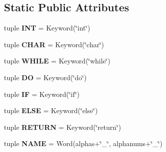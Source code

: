 \subsection*{Static Public Attributes}
\begin{DoxyCompactItemize}
\item 
\hypertarget{classxutools_1_1parsers_1_1_subset_c_parser_ab004e56225deb82d0e89f5968cf162ac}{tuple {\bfseries I\-N\-T} = Keyword(\char`\"{}int\char`\"{})}\label{classxutools_1_1parsers_1_1_subset_c_parser_ab004e56225deb82d0e89f5968cf162ac}

\item 
\hypertarget{classxutools_1_1parsers_1_1_subset_c_parser_a0655ec243d8c8fbed09faadf87ac3e81}{tuple {\bfseries C\-H\-A\-R} = Keyword(\char`\"{}char\char`\"{})}\label{classxutools_1_1parsers_1_1_subset_c_parser_a0655ec243d8c8fbed09faadf87ac3e81}

\item 
\hypertarget{classxutools_1_1parsers_1_1_subset_c_parser_a2b2f67890f89d4f05b394e1e363e0a23}{tuple {\bfseries W\-H\-I\-L\-E} = Keyword(\char`\"{}while\char`\"{})}\label{classxutools_1_1parsers_1_1_subset_c_parser_a2b2f67890f89d4f05b394e1e363e0a23}

\item 
\hypertarget{classxutools_1_1parsers_1_1_subset_c_parser_a44979c47896de6e9dfd0fb5503d74c64}{tuple {\bfseries D\-O} = Keyword(\char`\"{}do\char`\"{})}\label{classxutools_1_1parsers_1_1_subset_c_parser_a44979c47896de6e9dfd0fb5503d74c64}

\item 
\hypertarget{classxutools_1_1parsers_1_1_subset_c_parser_adcccb44537e8f224666d6df14bf7299b}{tuple {\bfseries I\-F} = Keyword(\char`\"{}if\char`\"{})}\label{classxutools_1_1parsers_1_1_subset_c_parser_adcccb44537e8f224666d6df14bf7299b}

\item 
\hypertarget{classxutools_1_1parsers_1_1_subset_c_parser_a6ed20233d859b72417e5eb9c8bc2f4e2}{tuple {\bfseries E\-L\-S\-E} = Keyword(\char`\"{}else\char`\"{})}\label{classxutools_1_1parsers_1_1_subset_c_parser_a6ed20233d859b72417e5eb9c8bc2f4e2}

\item 
\hypertarget{classxutools_1_1parsers_1_1_subset_c_parser_a30695b5da46d2cca50dac3f6095586b7}{tuple {\bfseries R\-E\-T\-U\-R\-N} = Keyword(\char`\"{}return\char`\"{})}\label{classxutools_1_1parsers_1_1_subset_c_parser_a30695b5da46d2cca50dac3f6095586b7}

\item 
\hypertarget{classxutools_1_1parsers_1_1_subset_c_parser_a4fa9043f2d039d7247693f333684f0eb}{tuple {\bfseries N\-A\-M\-E} = Word(alphas+\char`\"{}\-\_\-\char`\"{}, alphanums+\char`\"{}\-\_\-\char`\"{})}\label{classxutools_1_1parsers_1_1_subset_c_parser_a4fa9043f2d039d7247693f333684f0eb}


\end{DoxyCompactItemize}
